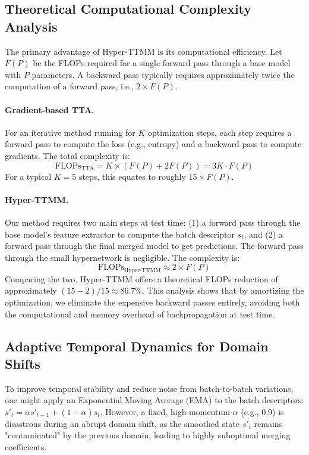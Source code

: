 \documentclass{article}
\theoremstyle{plain}
\theoremstyle{definition}
\theoremstyle{remark}
\begin{document}
\subsection{Theoretical Computational Complexity Analysis}
The primary advantage of Hyper-TTMM is its computational efficiency. Let $F(P)$ be the FLOPs required for a single forward pass through a base model with $P$ parameters. A backward pass typically requires approximately twice the computation of a forward pass, i.e., $2 \times F(P)$.

\paragraph{Gradient-based TTA.} For an iterative method running for $K$ optimization steps, each step requires a forward pass to compute the loss (e.g., entropy) and a backward pass to compute gradients. The total complexity is:
\begin{equation}
\text{FLOPs}_{\text{TTA}} = K \times (F(P) + 2 F(P)) = 3K \cdot F(P)
\end{equation}
For a typical $K=5$ steps, this equates to roughly $15 \times F(P)$.

\paragraph{Hyper-TTMM.} Our method requires two main steps at test time: (1) a forward pass through the base model's feature extractor to compute the batch descriptor $s_t$, and (2) a forward pass through the final merged model to get predictions. The forward pass through the small hypernetwork is negligible. The complexity is:
\begin{equation}
\text{FLOPs}_{\text{Hyper-TTMM}} \approx 2 \times F(P)
\end{equation}
Comparing the two, Hyper-TTMM offers a theoretical FLOPs reduction of approximately $(15 - 2) / 15 \approx 86.7\%$. This analysis shows that by amortizing the optimization, we eliminate the expensive backward passes entirely, avoiding both the computational and memory overhead of backpropagation at test time.

\subsection{Adaptive Temporal Dynamics for Domain Shifts}
\label{sec:adaptive-ema}
To improve temporal stability and reduce noise from batch-to-batch variations, one might apply an Exponential Moving Average (EMA) to the batch descriptors: $s'_t = \alpha s'_{t-1} + (1-\alpha)s_t$. However, a fixed, high-momentum $\alpha$ (e.g., 0.9) is disastrous during an abrupt domain shift, as the smoothed state $s'_{t}$ remains "contaminated" by the previous domain, leading to highly suboptimal merging coefficients.
\end{document}
